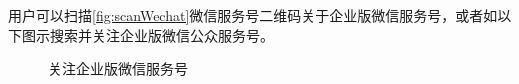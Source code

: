 用户可以扫描\ref{fig:scanWechat}微信服务号二维码关于企业版微信服务号，或者如以下图示搜索并关注企业版微信公众服务号。 \par

\begin{figure}[htbp!]
  \centering
  \caption{关注企业版微信服务号}
\end{figure}